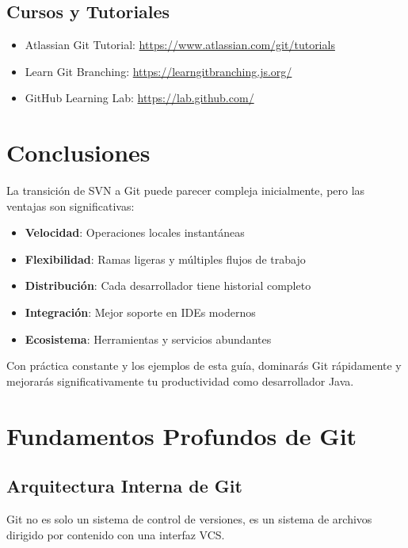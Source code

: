 \documentclass[12pt,a4paper]{article}
\begin{document}
\subsection{Cursos y Tutoriales}
\begin{itemize}
    \item Atlassian Git Tutorial: \url{https://www.atlassian.com/git/tutorials}
    \item Learn Git Branching: \url{https://learngitbranching.js.org/}
    \item GitHub Learning Lab: \url{https://lab.github.com/}
\end{itemize}

\section{Conclusiones}

La transición de SVN a Git puede parecer compleja inicialmente, pero las ventajas son significativas:

\begin{itemize}
    \item \textbf{Velocidad}: Operaciones locales instantáneas
    \item \textbf{Flexibilidad}: Ramas ligeras y múltiples flujos de trabajo
    \item \textbf{Distribución}: Cada desarrollador tiene historial completo
    \item \textbf{Integración}: Mejor soporte en IDEs modernos
    \item \textbf{Ecosistema}: Herramientas y servicios abundantes
\end{itemize}

Con práctica constante y los ejemplos de esta guía, dominarás Git rápidamente y mejorarás significativamente tu productividad como desarrollador Java.

\section{Fundamentos Profundos de Git}

\subsection{Arquitectura Interna de Git}
Git no es solo un sistema de control de versiones, es un sistema de archivos dirigido por contenido con una interfaz VCS.
\end{document}
